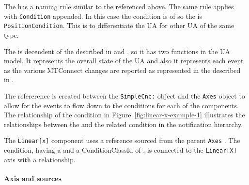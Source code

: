 The  has a naming rule similar to the  referenced above. The same rule applies with \texttt{Condition} appended. In this case the condition is of   so the  is \texttt{PositionCondition}. This is to differentiate the UA  for other UA  of the same type.

The  is decendent of the  described in \cite{UAPart5} and \cite{UAPart9}, so it has two functions in the UA model. It represents the overall state of the UA  and also it represents each event as the various MTConnect  changes are reported as represented in the  described in \cite{MTCPart3}.

The  refererence is created between the \texttt{SimpleCnc:} object and the \texttt{Axes} object to allow for the events to flow down to the conditions for each of the components. The relationship of the condition in Figure~\ref{fig:linear-x-example-1} illustrates the relationships between the  and the related condition in the notification hierarchy.

 The \texttt{Linear[x]} component uses a  reference sourced from the parent \texttt{Axes} . The condition, having a  and a ConditionClassId of , is connected to the \texttt{Linear[X]} axis with a  relationship. 

\FloatBarrier

\paragraph{ Axis and  sources}

